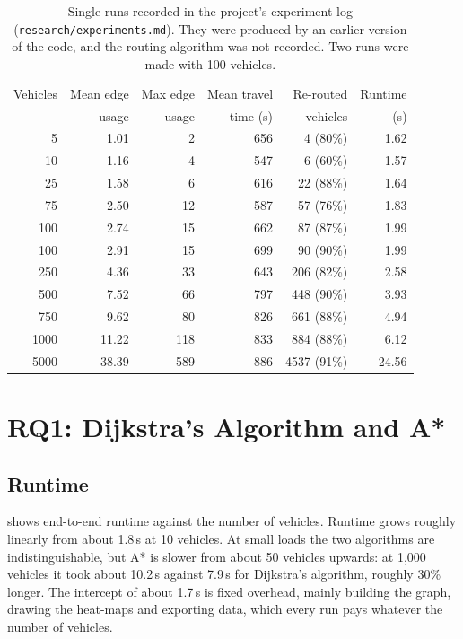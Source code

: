 \documentclass[12pt]{report}
\newcommand{\code}[1]{\texttt{#1}}
\begin{document}
\begin{table}[htbp]
\centering
\caption[Single runs from the project's experiment log]{Single runs recorded in the project's experiment log (\code{research/experiments.md}). They were produced by an earlier version of the code, and the routing algorithm was not recorded. Two runs were made with 100 vehicles.}
\label{tab:explog}
\small
\begin{tabular}{rrrrrr}
\toprule
Vehicles & Mean edge & Max edge & Mean travel & Re-routed & Runtime \\
 & usage & usage & time (s) & vehicles & (s) \\
\midrule
5    & 1.01  & 2   & 656 & 4 (80\%)    & 1.62 \\
10   & 1.16  & 4   & 547 & 6 (60\%)    & 1.57 \\
25   & 1.58  & 6   & 616 & 22 (88\%)   & 1.64 \\
75   & 2.50  & 12  & 587 & 57 (76\%)   & 1.83 \\
100  & 2.74  & 15  & 662 & 87 (87\%)   & 1.99 \\
100  & 2.91  & 15  & 699 & 90 (90\%)   & 1.99 \\
250  & 4.36  & 33  & 643 & 206 (82\%)  & 2.58 \\
500  & 7.52  & 66  & 797 & 448 (90\%)  & 3.93 \\
750  & 9.62  & 80  & 826 & 661 (88\%)  & 4.94 \\
1000 & 11.22 & 118 & 833 & 884 (88\%)  & 6.12 \\
5000 & 38.39 & 589 & 886 & 4537 (91\%) & 24.56 \\
\bottomrule
\end{tabular}
\end{table}

\section{RQ1: Dijkstra's Algorithm and A*}

\subsection{Runtime}

 shows end-to-end runtime against the number of vehicles. Runtime grows roughly linearly from about 1.8\,s at 10 vehicles. At small loads the two algorithms are indistinguishable, but A* is slower from about 50 vehicles upwards: at 1,000 vehicles it took about 10.2\,s against 7.9\,s for Dijkstra's algorithm, roughly 30\% longer. The intercept of about 1.7\,s is fixed overhead, mainly building the graph, drawing the heat-maps and exporting data, which every run pays whatever the number of vehicles.
\end{document}
